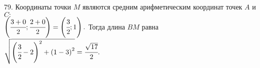 79. Координаты точки $M$ являются средним арифметическим координат точек $A$ и $C:$\\$ \left(\cfrac{3+0}{2}; \cfrac{2+0}{2}\right)=\left(\cfrac{3}{2};1\right).$ Тогда длина $BM$ равна $\sqrt{\left(\cfrac{3}{2}-2\right)^2+\left(1-3\right)^2}=\cfrac{\sqrt{17}}{2}.$\\
